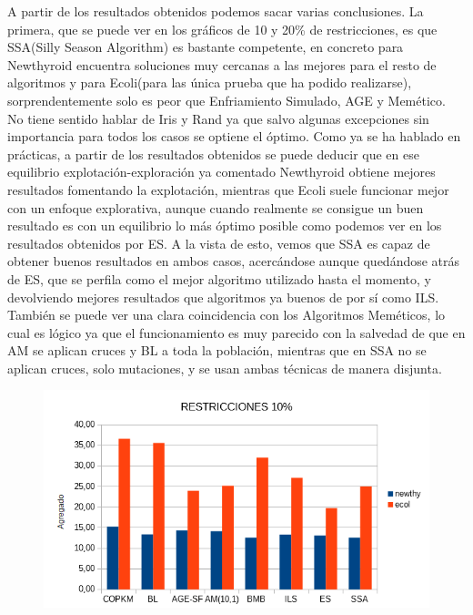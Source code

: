 \documentclass{article}
\begin{document}
	A partir de los resultados obtenidos podemos sacar varias conclusiones. La primera, que se puede ver en los gráficos de 10 y 20\% de restricciones, es que SSA(Silly Season Algorithm) es bastante competente, en concreto para Newthyroid encuentra soluciones muy cercanas a las mejores para el resto de algoritmos y para Ecoli(para las única prueba que ha podido realizarse), sorprendentemente solo es peor que Enfriamiento Simulado, AGE y Memético. No tiene sentido hablar de Iris y Rand ya que salvo algunas excepciones sin importancia para todos los casos se optiene el óptimo. Como ya se ha hablado en prácticas, a partir de los resultados obtenidos se puede deducir que en ese equilibrio explotación-exploración ya comentado Newthyroid obtiene mejores resultados fomentando la explotación, mientras que Ecoli suele funcionar mejor con un enfoque explorativa, aunque cuando realmente se consigue un buen resultado es con un equilibrio lo más óptimo posible como podemos ver en los resultados obtenidos por ES. A la vista de esto, vemos que SSA es capaz de obtener buenos resultados en ambos casos, acercándose aunque quedándose atrás de ES, que se perfila como el mejor algoritmo utilizado hasta el momento, y devolviendo mejores resultados que algoritmos ya buenos de por sí como ILS. También se puede ver una clara coincidencia con los Algoritmos Meméticos, lo cual es lógico ya que el funcionamiento es muy parecido con la salvedad de que en AM se aplican cruces y BL a toda la población, mientras que en SSA no se aplican cruces, solo mutaciones, y se usan ambas técnicas de manera disjunta.
	
	\begin{figure}[H]
		\includegraphics[width=\linewidth]{imagenes/f_10.png}
		\label{fig:boat3}
	\end{figure}
\end{document}
